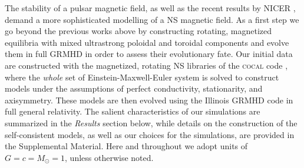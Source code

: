 \documentclass[twocolumn,superscriptaddress,showpacs,prl,aps,amsmath,amssymb,nofootinbib]{revtex4-1}
\begin{document}
The stability of a pulsar magnetic field, as well as the recent results by
NICER \cite{Miller_2019,Riley:2019}, demand a more sophisticated modelling of a
NS magnetic field. As a first step we go beyond the previous works
above by constructing rotating, magnetized equilibria with mixed ultrastrong
poloidal and toroidal components and evolve them in full GRMHD in order to
assess their evolutionary fate.  Our initial data are constructed with the
magnetized, rotating NS libraries of the \textsc{cocal} code
\cite{Uryu:2014tda,Uryu:2019ckz}, where the \textit{whole} set of
Einstein-Maxwell-Euler system is solved to construct models under the assumptions of perfect
conductivity, stationarity, and axisymmetry. These models are then evolved
using the Illinois GRMHD code \cite{Etienne:2010ui} in full general relativity.
The salient characteristics of our simulations are summarized in the
\textit{Results} section below, while details on the construction of the
self-consistent models, as well as our choices for the simulations, are provided
in the Supplemental Material. Here and throughout we adopt units of 
$G=c=M_\odot=1$, unless otherwise noted.
\end{document}
